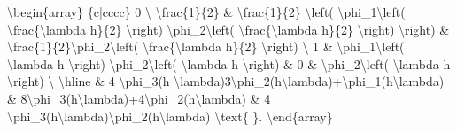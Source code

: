 \documentclass[letterpaper,10pt,english]{jupyterBook}
\begin{document}
\sphinxAtStartPar
\textbackslash{}begin\{array\}
\{c|cccc\}
0 \textbackslash{}
\textbackslash{}frac\{1\}\{2\} \& \textbackslash{}frac\{1\}\{2\} \textbackslash{}left( \textbackslash{}phi\_1\textbackslash{}left(\sphinxhyphen{} \textbackslash{}frac\{\textbackslash{}lambda h\}\{2\} \textbackslash{}right) \sphinxhyphen{} \textbackslash{}phi\_2\textbackslash{}left(\sphinxhyphen{} \textbackslash{}frac\{\textbackslash{}lambda h\}\{2\} \textbackslash{}right) \textbackslash{}right) \& \textbackslash{}frac\{1\}\{2\}\textbackslash{}phi\_2\textbackslash{}left(\sphinxhyphen{} \textbackslash{}frac\{\textbackslash{}lambda h\}\{2\} \textbackslash{}right) \textbackslash{}
1 \& \textbackslash{}phi\_1\textbackslash{}left(\sphinxhyphen{} \textbackslash{}lambda h \textbackslash{}right) \sphinxhyphen{} \textbackslash{}phi\_2\textbackslash{}left(\sphinxhyphen{} \textbackslash{}lambda h \textbackslash{}right) \& 0 \& \textbackslash{}phi\_2\textbackslash{}left(\sphinxhyphen{} \textbackslash{}lambda h \textbackslash{}right)  \textbackslash{}
\textbackslash{}hline
\& 4 \textbackslash{}phi\_3(\sphinxhyphen{}h \textbackslash{}lambda)\sphinxhyphen{}3\textbackslash{}phi\_2(\sphinxhyphen{}h\textbackslash{}lambda)+\textbackslash{}phi\_1(\sphinxhyphen{}h\textbackslash{}lambda) \& \sphinxhyphen{}8\textbackslash{}phi\_3(\sphinxhyphen{}h\textbackslash{}lambda)+4\textbackslash{}phi\_2(\sphinxhyphen{}h\textbackslash{}lambda) \& 4 \textbackslash{}phi\_3(\sphinxhyphen{}h\textbackslash{}lambda)\sphinxhyphen{}\textbackslash{}phi\_2(\sphinxhyphen{}h\textbackslash{}lambda) \textbackslash{}text\{   \}.
\textbackslash{}end\{array\}
\end{document}
